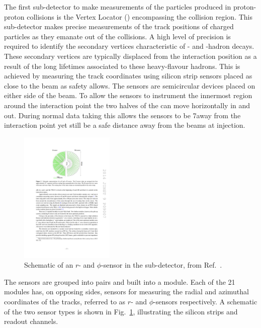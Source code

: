 The first sub-detector to make measurements of the particles produced in proton-proton collisions is the Vertex Locator (\velo) encompassing the collision region. This sub-detector makes precise measurements of the track positions of charged particles as they emanate out of the collisions. A high level of precision is required to identify the secondary vertices characteristic of \bquark- and \cquark-hadron decays. These secondary vertices are typically displaced from the interaction position as a result of the long lifetimes associated to these heavy-flavour hadrons. This is achieved by measuring the track coordinates using silicon strip sensors placed as close to the \lhc beam as safety allows. The \velo sensors are semicircular devices placed on either side of the beam. To allow the sensors to instrument the innermost region around the interaction point the two halves of the \velo can move horizontally in and out. During normal data taking this allows the sensors to be 7\mm away from the interaction point yet still be a safe distance away from the beams at injection. 

\begin{figure}[!h]
    \centering   
    \includegraphics[width=0.4\textwidth]{figs/Detector/velo_r_phi_sensor.pdf}
    \caption{Schematic of an $r$- and $\phi$-sensor in the \velo sub-detector, from Ref.~\cite{LHCb-DP-2014-001}.}
    \label{fig:Dec_r_phi_sensor}   
\end{figure}

The sensors are grouped into pairs and built into a module. Each of the 21 modules has, on opposing sides, sensors for measuring the radial and azimuthal coordinates of the tracks, referred to as $r$- and $\phi$-sensors respectively. A schematic of the two sensor types is shown in Fig.~\ref{fig:Dec_r_phi_sensor}, illustrating the silicon strips and readout channels. 


